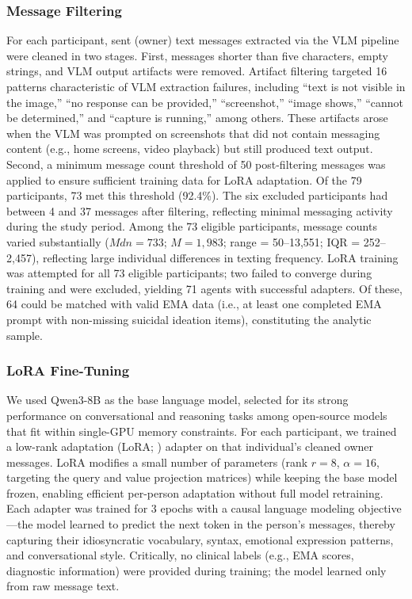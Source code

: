 \documentclass[review,12pt,authoryear]{elsarticle}
\begin{document}
\subsubsection{Message Filtering}

For each participant, sent (owner) text messages extracted via the VLM pipeline were cleaned in two stages. First, messages shorter than five characters, empty strings, and VLM output artifacts were removed. Artifact filtering targeted 16 patterns characteristic of VLM extraction failures, including ``text is not visible in the image,'' ``no response can be provided,'' ``screenshot,'' ``image shows,'' ``cannot be determined,'' and ``capture is running,'' among others. These artifacts arose when the VLM was prompted on screenshots that did not contain messaging content (e.g., home screens, video playback) but still produced text output. Second, a minimum message count threshold of 50 post-filtering messages was applied to ensure sufficient training data for LoRA adaptation. Of the 79 participants, 73 met this threshold (92.4\%). The six excluded participants had between 4 and 37 messages after filtering, reflecting minimal messaging activity during the study period. Among the 73 eligible participants, message counts varied substantially ($Mdn = 733$; $M = 1{,}983$; range = 50--13,551; IQR = 252--2,457), reflecting large individual differences in texting frequency. LoRA training was attempted for all 73 eligible participants; two failed to converge during training and were excluded, yielding 71 agents with successful adapters. Of these, 64 could be matched with valid EMA data (i.e., at least one completed EMA prompt with non-missing suicidal ideation items), constituting the analytic sample.

\subsubsection{LoRA Fine-Tuning}

We used Qwen3-8B \citep{qwen2025qwen3} as the base language model, selected for its strong performance on conversational and reasoning tasks among open-source models that fit within single-GPU memory constraints. For each participant, we trained a low-rank adaptation (LoRA; \citealt{hu2022lora}) adapter on that individual's cleaned owner messages. LoRA modifies a small number of parameters (rank $r = 8$, $\alpha = 16$, targeting the query and value projection matrices) while keeping the base model frozen, enabling efficient per-person adaptation without full model retraining. Each adapter was trained for 3 epochs with a causal language modeling objective---the model learned to predict the next token in the person's messages, thereby capturing their idiosyncratic vocabulary, syntax, emotional expression patterns, and conversational style. Critically, no clinical labels (e.g., EMA scores, diagnostic information) were provided during training; the model learned only from raw message text.
\end{document}
